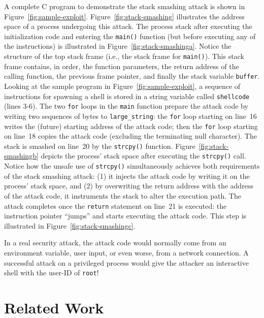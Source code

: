 \documentclass[]{article}
\begin{document}
A complete C program to demonstrate the stack smashing attack is shown
in Figure~\ref{fig:sample-exploit}.  Figure~\ref{fig:stack-smashing}
illustrates the address space of a process undergoing this attack.
The process stack after executing the initialization code and entering
the {\tt main()} function (but before executing any of the
instructions) is illustrated in Figure~\ref{fig:stack-smashinga}.
Notice the structure of the top stack frame (i.e., the stack frame for
{\tt main()}).  This stack frame contains, in order, the function
parameters, the return address of the calling function, the previous
frame pointer, and finally the stack variable {\tt buffer}.  Looking
at the sample program in Figure~\ref{fig:sample-exploit}, a sequence
of instructions for spawning a shell is stored in a string variable
called {\tt shellcode} (lines 3-6).  The two {\tt for} loops in the
{\tt main} function prepare the attack code by writing two sequences
of bytes to {\tt large\_string}: the {\tt for} loop starting on
line~16 writes the (future) starting address of the attack code; then
the {\tt for} loop starting on line~18 copies the attack code
(excluding the terminating null character).  The stack is smashed on
line~20 by the {\tt strcpy()} function.
Figure~\ref{fig:stack-smashingb} depicts the process' stack space
after executing the {\tt strcpy()} call.  Notice how the unsafe use of
{\tt strcpy()} simultaneously achieves both requirements of the stack
smashing attack: (1) it injects the attack code by writing it on the
process' stack space, and (2) by overwriting the return address with
the address of the attack code, it instruments the stack to alter the
execution path.  The attack completes once the {\tt return} statement
on line~21 is executed: the instruction pointer ``jumps'' and starts
executing the attack code.  This step is illustrated in
Figure~\ref{fig:stack-smashingc}.

In a real security attack, the attack code would normally come from an
environment variable, user input, or even worse, from a network connection.  A
successful attack on a privileged process would give the attacker an
interactive shell with the user-ID of {\tt root}!



\section{Related Work}
\label{sec:related_work}
\end{document}
